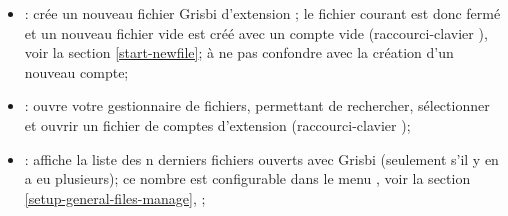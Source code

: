 \noindent
\begin{minipage}{.7\linewidth}
	\begin{itemize}[rightmargin=.6cm]
		\item {}: crée un nouveau fichier Grisbi d'\gls{extension} ; le fichier courant est donc fermé et un nouveau fichier vide est créé avec un compte vide (raccourci-clavier ), voir la section \vref{start-newfile}; à ne pas confondre avec la création d'un nouveau compte;	 
		\item {}: ouvre votre gestionnaire de fichiers, permettant de rechercher, sélectionner et ouvrir un fichier de comptes d'\gls{extension}  (raccourci-clavier );
		\item {}: affiche la liste des n derniers fichiers ouverts avec Grisbi (seulement s'il y en a eu plusieurs); ce nombre est configurable dans le menu , voir la section \vref{setup-general-files-manage}, ;
	\end{itemize}
\end{minipage}
\hspace{10pt}	
